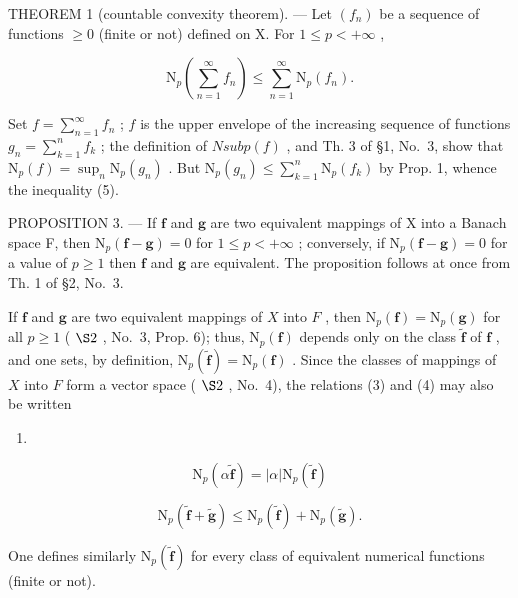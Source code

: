 THEOREM 1 (countable convexity theorem). --- Let \((f_n)\) be a sequence of functions \(\geqslant 0\) (finite or not) defined on X. For \(1 \leqslant p < +\infty\) ,

\[
\mathrm{N} _ {p} \left(\sum_ {n = 1} ^ {\infty} f _ {n}\right) \leqslant \sum_ {n = 1} ^ {\infty} \mathrm{N} _ {p} (f _ {n}).\tag{5}
\]

Set \(f = \sum_{n=1}^{\infty} f_n\) ; \(f\) is the upper envelope of the increasing sequence of functions \(g_n = \sum_{k=1}^{n} f_k\) ; the definition of \(N sub p(f)\) , and Th. 3 of §1, No.~3, show that \(\mathrm{N}_{p}(f)=\sup_{n}\mathrm{N}_{p}(g_{n})\) . But \(\mathrm{N}_{p}(g_{n})\leqslant\sum_{k=1}^{n}\mathrm{N}_{p}(f_{k})\) by Prop. 1, whence the inequality (5).

PROPOSITION 3. --- If \(\mathbf{f}\) and \(\mathbf{g}\) are two equivalent mappings of X into a Banach space F, then \(\mathrm{N}_p(\mathbf{f} - \mathbf{g}) = 0\) for \(1 \leqslant p < +\infty\) ; conversely, if \(\mathrm{N}_p(\mathbf{f} - \mathbf{g}) = 0\) for a value of \(p \geqslant 1\) then \(\mathbf{f}\) and \(\mathbf{g}\) are equivalent. The proposition follows at once from Th. 1 of §2, No.~3.

If \(\mathbf{f}\) and \(\mathbf{g}\) are two equivalent mappings of \(X\) into \(F\) , then \(\mathrm{N}_p(\mathbf{f}) = \mathrm{N}_p(\mathbf{g})\) for all \(p \geqslant 1\) ( \(\S 2\) , No.~3, Prop. 6); thus, \(\mathrm{N}_p(\mathbf{f})\) depends only on the class \(\widetilde{\mathbf{f}}\) of \(\mathbf{f}\) , and one sets, by definition, \(\mathrm{N}_p(\widetilde{\mathbf{f}}) = \mathrm{N}_p(\mathbf{f})\) . Since the classes of mappings of \(X\) into \(F\) form a vector space ( \(\S 2\) , No.~4), the relations (3) and (4) may also be written

\begin{enumerate}
\def\labelenumi{(\arabic{enumi})}
\setcounter{enumi}{5}
\tightlist
\item
\end{enumerate}

\[
\mathrm{N} _ {p} (\alpha \widetilde {\mathbf {f}}) = | \alpha | \mathrm{N} _ {p} (\widetilde {\mathbf {f}})\tag{7}
\]

\[
\mathrm{N} _ {p} (\widetilde {\mathbf {f}} + \widetilde {\mathbf {g}}) \leqslant \mathrm{N} _ {p} (\widetilde {\mathbf {f}}) + \mathrm{N} _ {p} (\widetilde {\mathbf {g}}).
\]

One defines similarly \(\mathrm{N}_{p}(\tilde{\mathbf{f}})\) for every class of equivalent numerical functions (finite or not).


